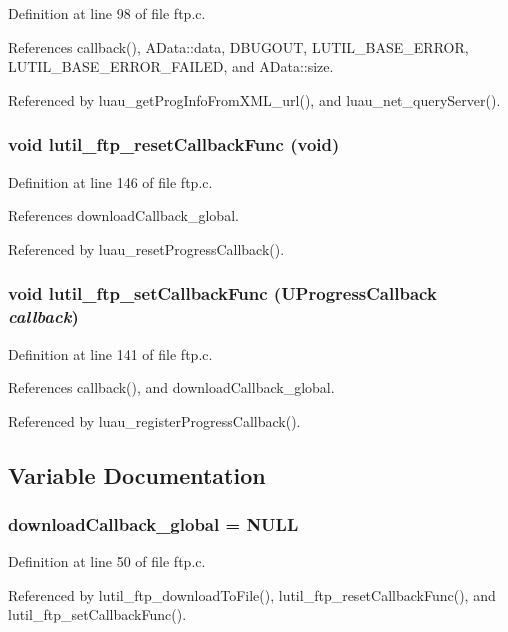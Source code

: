 Definition at line 98 of file ftp.c.

References callback(), AData::data, DBUGOUT, LUTIL\_\-BASE\_\-ERROR, LUTIL\_\-BASE\_\-ERROR\_\-FAILED, and AData::size.

Referenced by luau\_\-get\-Prog\-Info\-From\-XML\_\-url(), and luau\_\-net\_\-query\-Server().
\subsubsection{\setlength{\rightskip}{0pt plus 5cm}void lutil\_\-ftp\_\-reset\-Callback\-Func (void)}\label{ftp_8c_a5}




Definition at line 146 of file ftp.c.

References download\-Callback\_\-global.

Referenced by luau\_\-reset\-Progress\-Callback().
\subsubsection{\setlength{\rightskip}{0pt plus 5cm}void lutil\_\-ftp\_\-set\-Callback\-Func ({\bf UProgress\-Callback} {\em callback})}\label{ftp_8c_a4}




Definition at line 141 of file ftp.c.

References callback(), and download\-Callback\_\-global.

Referenced by luau\_\-register\-Progress\-Callback().

\subsection{Variable Documentation}
\subsubsection{ {\bf download\-Callback\_\-global} = NULL\hspace{0.3cm}{\tt  [static]}}\label{ftp_8c_a0}




Definition at line 50 of file ftp.c.

Referenced by lutil\_\-ftp\_\-download\-To\-File(), lutil\_\-ftp\_\-reset\-Callback\-Func(), and lutil\_\-ftp\_\-set\-Callback\-Func().